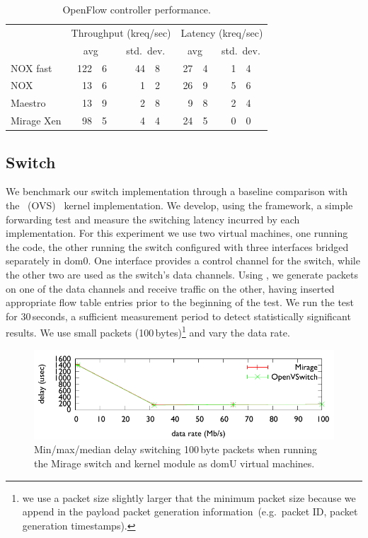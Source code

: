 \begin{table}
\newcommand\T{\rule{0pt}{2.6ex}}
\newcommand\B{\rule[-1.2ex]{0pt}{0pt}}
\centering
\begin{tabular} {l |r@{.}l r@{.}l|r@{.}l r@{.}l}
\hline
\T \multirow{2}{*}{Controller} 
   & \multicolumn{4}{c|}{Throughput (kreq/sec)}  
   & \multicolumn{4}{c}{Latency (kreq/sec)} \\
\B & \multicolumn{2}{c}{avg} & \multicolumn{2}{c|}{std.\ dev.} 
   & \multicolumn{2}{c}{avg} & \multicolumn{2}{c}{std.\ dev.} \\
\hline
\T NOX fast   & 122&6 & \quad{} 44&8 & 27&4 & \quad{} 1&4 \\
NOX           &  13&6 &  1&2 & 26&9 & 5&6 \\
Maestro       &  13&9 &  2&8 &  9&8 & 2&4 \\
\B Mirage Xen &  98&5 &  4&4 & 24&5 & 0&0 \\
\hline
\end{tabular}
\caption{\label{tbl:controller}OpenFlow controller performance.}
\end{table}

\subsection{\mirage Switch} \label{sec:of-switch-perf}

We benchmark our \mirage \of switch implementation through a baseline comparison
with the \ovs~(OVS)~\cite{openvswitch} kernel implementation.  We
develop, using the \oflops framework, a simple forwarding test and measure the
switching latency incurred by each implementation.  For this experiment we use
two virtual machines, one running the \oflops code, the other running the
\of switch configured with three interfaces bridged separately in dom0. One
interface provides a control channel for the switch, while the other two are
used as the switch's data channels. Using \oflops, we generate packets on one of
the data channels and receive traffic on the other, having inserted appropriate
flow table entries prior to the beginning of the test. We run the test for
30\,seconds, a sufficient measurement period to detect statistically significant
results. We use small packets (100\,bytes)\footnote{we use a packet size
  slightly larger that the minimum packet size because we append in the
  payload packet generation information~(e.g.~packet ID, packet generation
  timestamps).} and vary the data rate.

\begin{figure}
\centering
\includegraphics[width=\columnwidth]{switch-media-delay}
\caption{\label{fig:switch}Min/max/median delay switching 100\,byte packets
        when running the Mirage switch and \ovs kernel module as domU
        virtual machines.}
\end{figure}

